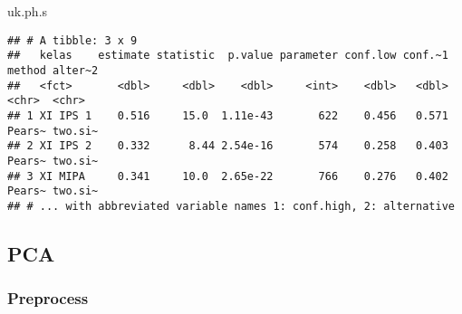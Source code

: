 \documentclass[
]{article}
\newenvironment{Shaded}{\begin{snugshade}}{\end{snugshade}}
\newcommand{\AttributeTok}[1]{\textcolor[rgb]{0.77,0.63,0.00}{#1}}
\newcommand{\FunctionTok}[1]{\textcolor[rgb]{0.00,0.00,0.00}{#1}}
\newcommand{\NormalTok}[1]{#1}
\newcommand{\OtherTok}[1]{\textcolor[rgb]{0.56,0.35,0.01}{#1}}
\newcommand{\SpecialCharTok}[1]{\textcolor[rgb]{0.00,0.00,0.00}{#1}}
\begin{document}
\begin{Shaded}
\end{Shaded}

\begin{Shaded}
\begin{Highlighting}[]
\NormalTok{uk.ph.s}
\end{Highlighting}
\end{Shaded}

\begin{verbatim}
## # A tibble: 3 x 9
##   kelas    estimate statistic  p.value parameter conf.low conf.~1 method alter~2
##   <fct>       <dbl>     <dbl>    <dbl>     <int>    <dbl>   <dbl> <chr>  <chr>  
## 1 XI IPS 1    0.516     15.0  1.11e-43       622    0.456   0.571 Pears~ two.si~
## 2 XI IPS 2    0.332      8.44 2.54e-16       574    0.258   0.403 Pears~ two.si~
## 3 XI MIPA     0.341     10.0  2.65e-22       766    0.276   0.402 Pears~ two.si~
## # ... with abbreviated variable names 1: conf.high, 2: alternative
\end{verbatim}

\hypertarget{pca}{%
\subsection{PCA}\label{pca}}

\hypertarget{preprocess}{%
\subsubsection{Preprocess}\label{preprocess}}
\end{document}
